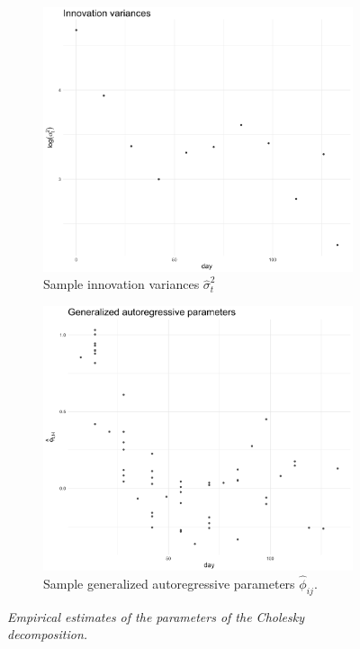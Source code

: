 \begin{figure}[H]
 \begin{subfigure}[t]{.48\textwidth}
  \centering
    \includegraphics[width=\textwidth]{img/cattle/cattleA-innovation-variogram}
 \caption{Sample innovation variances $\hat{\sigma}_t^2$} \label{fig:cattleA-innovation-variogram}
 \end{subfigure}
 \begin{subfigure}[t]{.48\textwidth}
  \centering
\includegraphics[width = \textwidth]{img/cattle/cattleA-regressogram}
 \caption{Sample generalized autoregressive parameters $\hat{\phi}_{ij}$.}
\label{fig:cattleA-regressogram}
 \end{subfigure}
 \caption{\textit{Empirical estimates of the parameters of the Cholesky decomposition.}} \label{fig:cattleA-innovation-variogram-and-regressogram}
\end{figure}

